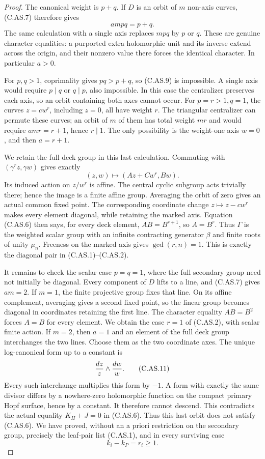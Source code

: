 \begin{proof}
The canonical weight is $p+q$. If $D$ is an orbit of
$m$ non-axis curves, (C.AS.7) therefore gives
\[
                              ampq=p+q.                 \tag{C.AS.9}
\]
The same calculation with a single axis replaces $mpq$
by $p$ or $q$. These are genuine character equalities:
a purported extra holomorphic unit and its inverse
extend across the origin, and their nonzero value there
forces the identical character. In particular $a>0$.

For $p,q>1$, coprimality gives $pq>p+q$, so (C.AS.9)
is impossible. A single axis would require $p\mid q$
or $q\mid p$, also impossible. In this case the
centralizer preserves each axis, so an orbit containing
both axes cannot occur. For $p=r>1,q=1$, the curves
$z=cw^r$, including $z=0$, all have weight $r$.
The triangular centralizer can permute these curves;
an orbit of $m$ of them has total weight $mr$ and
would require $amr=r+1$, hence $r\mid1$.
The only possibility is the weight-one axis $w=0$,
and then $a=r+1$.

We retain the full deck group in this last calculation.
Commuting with $(\gamma^rz,\gamma w)$ gives exactly
\[
              (z,w)\longmapsto(Az+Cw^r,Bw).             \tag{C.AS.10}
\]
Its induced action on $z/w^r$ is affine. The central
cyclic subgroup acts trivially there; hence the image
is a finite affine group. Averaging the orbit of zero
gives an actual common fixed point. The corresponding
coordinate change $z\mapsto z-cw^r$ makes every element
diagonal, while retaining the marked axis. Equation
(C.AS.6) then says, for every deck element,
$AB=B^{r+1}$, so $A=B^r$. Thus $\Gamma$ is the
weighted scalar group with an infinite contracting
generator $\beta$ and finite roots of unity
$\mu_n$. Freeness on the marked axis gives
$\gcd(r,n)=1$. This is exactly the diagonal pair in
(C.AS.1)--(C.AS.2).

It remains to check the scalar case $p=q=1$,
where the full secondary group need not initially
be diagonal. Every component of $D$ lifts to a
line, and (C.AS.7) gives $am=2$. If $m=1$,
the finite projective group fixes that line.
On its affine complement, averaging gives a
second fixed point, so the linear group becomes
diagonal in coordinates retaining the first line.
The character equality $AB=B^2$ forces $A=B$
for every element. We obtain the case $r=1$
of (C.AS.2), with scalar finite action.
If $m=2$, then $a=1$ and an element of the full
deck group interchanges the two lines. Choose
them as the two coordinate axes. The unique
log-canonical form up to a constant is
\[
                             {dz\over z}\wedge{dw\over w}.
                                                               \tag{C.AS.11}
\]
Every such interchange multiplies this form
by $-1$. A form with exactly the same divisor
differs by a nowhere-zero holomorphic function
on the compact primary Hopf surface, hence by
a constant. It therefore cannot descend.
This contradicts the actual equality
$K_H+J=0$ in (C.AS.6). Thus this last orbit
does not satisfy (C.AS.6). We have proved,
without an a priori restriction on the secondary
group, precisely the leaf-pair list (C.AS.1),
and in every surviving case
\[
                              k_i-k_P=r_i\ge1.          \tag{C.AS.12}
\]


\end{proof}
